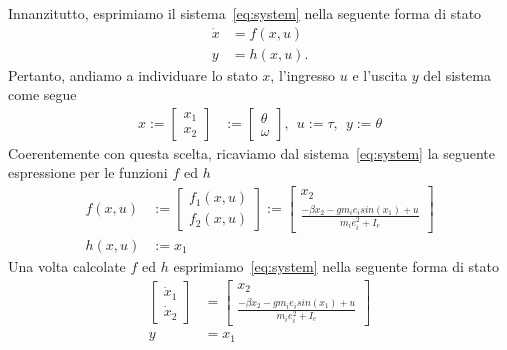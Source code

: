 \documentclass[a4paper, 11pt]{article}
\begin{document}
Innanzitutto, esprimiamo il sistema~\eqref{eq:system} nella seguente forma di stato
%
\begin{subequations}
\begin{align}\label{eq:state_form}
	\dot{x} &= f(x,u)
	\\
	y &= h(x,u).
\end{align}
\end{subequations}
%
Pertanto, andiamo a individuare lo stato $x$, l'ingresso $u$ e l'uscita $y$ del sistema come segue 
%
\begin{align*}
	x := \begin{bmatrix} 
                x_1
                \\ 
                x_2
                \end{bmatrix} &:= 
                \begin{bmatrix} 
                \theta 
                \\ 
                \omega
                \end{bmatrix}, \ \
                u := \tau, \ \ y := \theta 
\end{align*}
%
Coerentemente con questa scelta, ricaviamo dal sistema~\eqref{eq:system} la seguente espressione per le funzioni $f$ ed $h$
%
\begin{align*}
	f(x,u) &:= \begin{bmatrix} f_1(x,u)
                \\ 
                f_2(x,u)
                \end{bmatrix} := 
                \begin{bmatrix} 
                x_2 
                \\ 
                \frac{-\beta x_2-g m_i e_i sin(x_1)+ u}{m_i e_i^2 + I_e} 
                \end{bmatrix}
    \\
    h(x,u) &:= x_1
\end{align*}
%
Una volta calcolate $f$ ed $h$ esprimiamo~\eqref{eq:system} nella seguente forma di stato
%
\begin{subequations}\label{eq:our_system_state_form}
\begin{align}
	\begin{bmatrix} 
        \dot x_1
        \\ 
        \dot x_2
        \end{bmatrix} &= 
        \begin{bmatrix} 
        x_2 
        \\ 
        \frac{-\beta x_2-g m_i e_i sin(x_1)+ u}{m_i e_i^2 + I_e} 
        \end{bmatrix}
        \\
        y &= x_1
\end{align}
\end{subequations}
\end{document}
